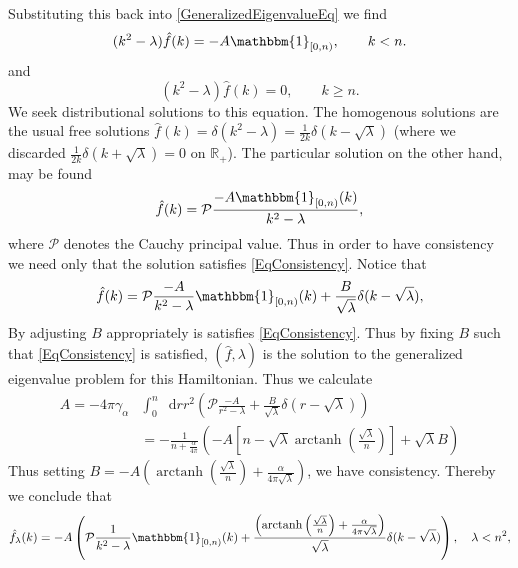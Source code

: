 \documentclass[a4paper,11pt]{article}
\DeclareMathOperator\arctanh{arctanh}
\newcommand*\diff{\mathop{}\!\mathrm{d}}
\newcommand{\R}{\mathbb{R}}
\numberwithin{equation}{section}
\begin{document}
	Substituting this back into \eqref{GeneralizedEigenvalueEq} we find \begin{equation}
		(k^2-\lambda)\hat{f}(k)=-A\mathbbm{1}_{[0,n)},\qquad k<n.
	\end{equation}
	and 
	 \begin{equation}
	 	(k^2-\lambda)\hat{f}(k)=0,\qquad k\geq n.
	 \end{equation}
	We seek distributional solutions to this equation. The homogenous solutions are the usual free solutions $ \hat{f}(k)=\delta(k^2-\lambda)=\frac{1}{2k}\delta(k-\sqrt{\lambda}) $ (where we discarded $ \frac{1}{2k}\delta(k+\sqrt{\lambda})=0 $ on $ \R_+ $). The particular solution on the other hand, may be found \begin{equation}\label{EqParticularSol}
	\hat{f}(k)=\mathcal{P}\frac{-A\mathbbm{1}_{[0,n)}(k)}{k^2-\lambda},
	\end{equation}
	where $ \mathcal{P} $ denotes the Cauchy principal value. Thus in order to have consistency we need only that the solution satisfies \eqref{EqConsistency}. Notice that \begin{equation}
	\hat{f}(k)=\mathcal{P}\frac{-A}{k^2-\lambda}\mathbbm{1}_{[0,n)}(k)+\frac{B}{\sqrt{\lambda}}\delta(k-\sqrt{\lambda}),
	\end{equation}
	By adjusting $ B $ appropriately is satisfies \eqref{EqConsistency}. Thus by fixing $ B $ such that \eqref{EqConsistency} is satisfied, $ (\hat{f},\lambda) $ is the solution to the generalized eigenvalue problem for this Hamiltonian. Thus we calculate \begin{equation}
	\begin{aligned}
	A=-4\pi\gamma_\alpha&\int_{0}^{n}\diff r r^2 \left(\mathcal{P}\frac{-A}{r^2-\lambda}+\frac{B}{\sqrt{\lambda}}\delta(r-\sqrt{\lambda})\right)\\&=-\frac{1}{n+\frac{\alpha}{4\pi}}\left(-A\left[n-\sqrt{\lambda}\arctanh\left(\frac{\sqrt{\lambda}}{n}\right)\right]+\sqrt{\lambda} B\right)
	\end{aligned}
	\end{equation}
	Thus setting $ B=-A\left(\arctanh\left(\frac{\sqrt{\lambda}}{n}\right)+\frac{\alpha}{4\pi\sqrt{\lambda}}\right) $, we have consistency. Thereby we conclude that \begin{equation}
	\hat{f}_\lambda(k)=-A\left(\mathcal{P}\frac{1}{k^2-\lambda}\mathbbm{1}_{[0,n)}(k)+\frac{\left(\arctanh\left(\frac{\sqrt{\lambda}}{n}\right)+\frac{\alpha}{4\pi\sqrt{\lambda}}\right)}{\sqrt{\lambda}}\delta(k-\sqrt{\lambda})\right),\quad \lambda<n^2,
	\end{equation}
\end{document}
